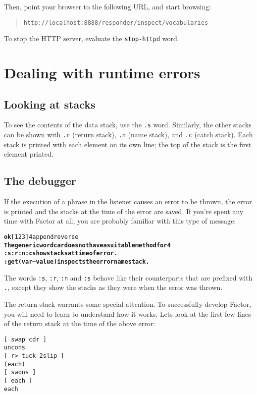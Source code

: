 \documentclass{book}
\begin{document}
Then, point your browser to the following URL, and start browsing:

\begin{quote}
\texttt{http://localhost:8888/responder/inspect/vocabularies}
\end{quote}

To stop the HTTP server, evaluate the \verb|stop-httpd| word.

\section{Dealing with runtime errors}

\subsection{Looking at stacks}

To see the contents of the data stack, use the \texttt{.s} word. Similarly, the other stacks can be shown with \texttt{.r} (return stack), \texttt{.n} (name stack), and \texttt{.c} (catch stack). Each stack is printed with each element on its own line; the top of the stack is the first element printed.

\subsection{The debugger}

If the execution of a phrase in the listener causes an error to be thrown, the error
is printed and the stacks at the time of the error are saved. If you're spent any
time with Factor at all, you are probably familiar with this type of message:

\begin{alltt}
\textbf{ok} [ 1 2 3 ] 4 append reverse
\textbf{The generic word car does not have a suitable method for 4
:s :r :n :c show stacks at time of error.
:get ( var -- value ) inspects the error namestack.}
\end{alltt}

The words \texttt{:s}, \texttt{:r}, \texttt{:n} and \texttt{:s} behave like their counterparts that are prefixed with \texttt{.}, except they show the stacks as they were when the error was thrown.

The return stack warrants some special attention. To successfully develop Factor, you will need to learn to understand how it works. Lets look at the first few lines of the return stack at the time of the above error:

\begin{verbatim}
[ swap cdr ]
uncons
[ r> tuck 2slip ]
(each)
[ swons ]
[ each ]
each
\end{verbatim}
\end{document}
